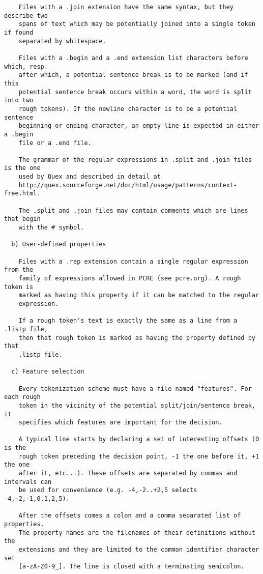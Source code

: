 \begin{tiny}
\begin{verbatim}
    Files with a .join extension have the same syntax, but they describe two
    spans of text which may be potentially joined into a single token if found
    separated by whitespace.

    Files with a .begin and a .end extension list characters before which, resp.
    after which, a potential sentence break is to be marked (and if this
    potential sentence break occurs within a word, the word is split into two
    rough tokens). If the newline character is to be a potential sentence
    beginning or ending character, an empty line is expected in either a .begin
    file or a .end file.

    The grammar of the regular expressions in .split and .join files is the one
    used by Quex and described in detail at
    http://quex.sourceforge.net/doc/html/usage/patterns/context-free.html.

    The .split and .join files may contain comments which are lines that begin
    with the # symbol.

  b) User-defined properties

    Files with a .rep extension contain a single regular expression from the
    family of expressions allowed in PCRE (see pcre.org). A rough token is
    marked as having this property if it can be matched to the regular
    expression.

    If a rough token's text is exactly the same as a line from a .listp file,
    then that rough token is marked as having the property defined by that
    .listp file.

  c) Feature selection

    Every tokenization scheme must have a file named "features". For each rough
    token in the vicinity of the potential split/join/sentence break, it
    specifies which features are important for the decision.

    A typical line starts by declaring a set of interesting offsets (0 is the
    rough token preceding the decision point, -1 the one before it, +1 the one
    after it, etc...). These offsets are separated by commas and intervals can
    be used for convenience (e.g. -4,-2..+2,5 selects -4,-2,-1,0,1,2,5).

    After the offsets comes a colon and a comma separated list of properties.
    The property names are the filenames of their definitions without the
    extensions and they are limited to the common identifier character set
    [a-zA-Z0-9_]. The line is closed with a terminating semicolon.


\end{verbatim}
\end{tiny}
